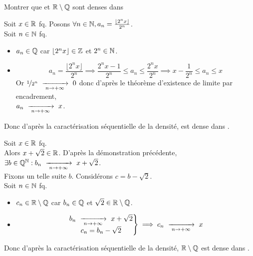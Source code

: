 \documentclass{article}
\begin{document}
\begin{question_kholle}
  {Montrer que \Q et $\mathbb R\setminus\mathbb Q$ sont denses dans \R}

  Soit $x \in \mathbb R$ fq.
  Posons $\forall n \in \mathbb N, a_n = \frac{\lfloor2^n x\rfloor}{2^n}$. \\
  Soit $n \in \mathbb N$ fq. \\
  \begin{itemize}
    \item $a_n \in \mathbb Q$ car $\lfloor2^n x\rfloor \in \mathbb Z$ et $2^n \in \mathbb N$.
    \item \begin{equation*}
            a_n = \frac{\lfloor2^n x\rfloor}{2^n}
            \implies \frac{2^n x - 1}{2^n} \leqslant a_n \leqslant \frac{2^n x}{2^n}
            \implies x - \frac{1}{2^n} \leqslant a_n \leqslant x
          \end{equation*}
          Or $\nicefrac{1}{2^n} \ \xrightarrow[\;n \to +\infty\;]{}\  0$ donc d'après le théorème d'existence de limite par encadrement, \\ $a_n \ \xrightarrow[\;n \to +\infty\;]{}\  x$.
  \end{itemize}
  Donc d'après la caractérisation séquentielle de la densité, \Q est dense dans \R.
  \bigbreak

  \noindent Soit $x \in \mathbb R$ fq. \\
  Alors $x + \sqrt{2} \in \mathbb R$.
  D'après la démonstration précédente, $\exists b \in \mathbb Q^{\mathbb N} : b_n \ \xrightarrow[\;n \to +\infty\;]{}\  x + \sqrt{2}$. \\
  Fixons un telle suite $b$.
  Considérons $c = b - \sqrt{2}$. \\
  Soit $n \in \mathbb N$ fq.
  \begin{itemize}
    \item $c_n \in \mathbb R\setminus\mathbb Q$ car $b_n \in \mathbb Q$ et $\sqrt{2} \in \mathbb R \setminus \mathbb Q$.
    \item \begin{equation*}
            \left. \begin{matrix}
              b_n \ \xrightarrow[\;n \to +\infty\;]{}\  x + \sqrt{2} \\
              c_n = b_n - \sqrt{2}
            \end{matrix} \right\}
            \implies c_n \ \xrightarrow[\;n \to +\infty\;]{}\  x
          \end{equation*}
  \end{itemize}
  Donc d'après la caractérisation séquentielle de la densité, $\mathbb R\setminus \mathbb Q$ est dense dans \R.
\end{question_kholle}
\end{document}
